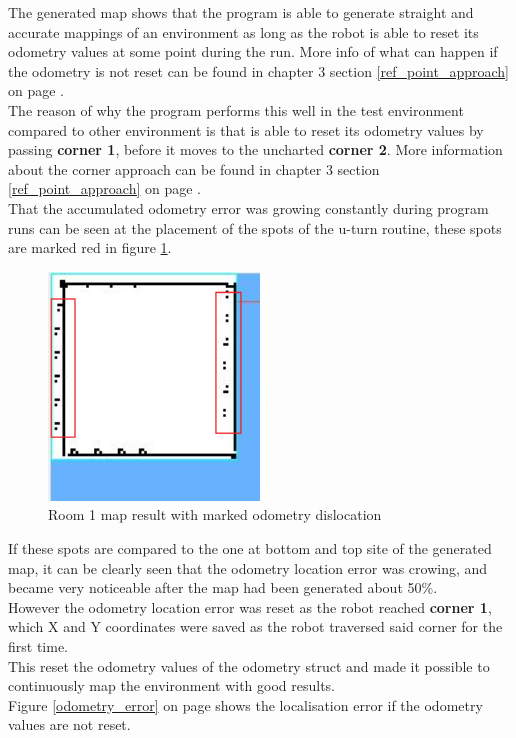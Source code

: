 The generated map shows that the program is able to generate straight and accurate mappings of an environment as long as the robot is able to reset its odometry values at some point during the run. More info of what can happen if the odometry is not reset can be found in chapter 3 section \ref{ref_point_approach} on page \pageref{ref_point_approach}.\\
The reason of why the program performs this well in the test environment compared to other environment is that is able to reset its odometry values by passing \textbf{corner 1}, before it moves to the uncharted \textbf{corner 2}. More information about the corner approach can be found in chapter 3 section \ref{ref_point_approach} on page \pageref{ref_point_approach}. \\
That the accumulated odometry error was growing constantly during program runs can be seen at the placement of the spots of the u-turn routine, these spots are marked red in figure \ref{room1_empty_marked}.

\begin{figure}[h]
\centering
\includegraphics[width = 0.5\textwidth]{../../figures/room1_result_marked.png}
\caption{Room 1 map result with marked odometry dislocation}
\label{room1_empty_marked}
\end{figure}

If these spots are compared to the one at bottom and top site of the generated map, it can be clearly seen that the odometry location error was crowing, and became very noticeable after the map had been generated about 50\%.\\[3ex]

However the odometry location error was reset as the robot reached \textbf{corner 1}, which X and Y coordinates were saved as the robot traversed said corner for the first time. \\
This reset the odometry values of the odometry struct and made it possible to continuously map the environment with good results. \\
Figure \ref{odometry_error} on page \pageref{odometry_error} shows the localisation error if the odometry values are not reset.\\[3ex]

